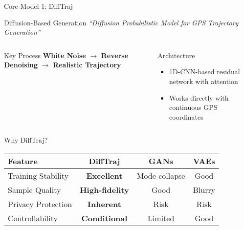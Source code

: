 \documentclass[aspectratio=169,xcolor={dvipsnames}]{beamer}
\newcommand{\highlight}[1]{\textcolor{RustyNail}{\textbf{#1}}}
\begin{document}
\begin{frame}{Core Model 1: DiffTraj \cite{zhuDiffTrajGeneratingGPS2023}}
  \begin{block}{Diffusion-Based Generation}
    \centering
    \textit{``Diffusion Probabilistic Model for GPS Trajectory Generation''}
  \end{block}
  
  \vspace{1em}
  \begin{columns}
    \begin{column}{0.6\textwidth}
      \begin{block}{Key Process}
        \centering
        \textbf{White Noise} $\rightarrow$ \textbf{Reverse Denoising} $\rightarrow$ \textbf{Realistic Trajectory}
      \end{block}
    \end{column}
    \begin{column}{0.4\textwidth}
      \begin{block}{Architecture}
        \begin{itemize}
          \item 1D-CNN-based residual network with attention
          \item Works directly with continuous GPS coordinates
        \end{itemize}
      \end{block}
    \end{column}
  \end{columns}
\end{frame}

\begin{frame}{Why DiffTraj?}
  \begin{table}[h]
    \centering
    \begin{tabular}{lccc}
      \toprule
      \textbf{Feature} & \textbf{DiffTraj} & \textbf{GANs} & \textbf{VAEs} \\
      \midrule
      Training Stability & \highlight{Excellent} & Mode collapse & Good \\
      Sample Quality & \highlight{High-fidelity} & Good & Blurry \\
      Privacy Protection & \highlight{Inherent} & Risk & Risk \\
      Controllability & \highlight{Conditional} & Limited & Good \\
      \bottomrule
    \end{tabular}
  \end{table}
\end{frame}
\end{document}
